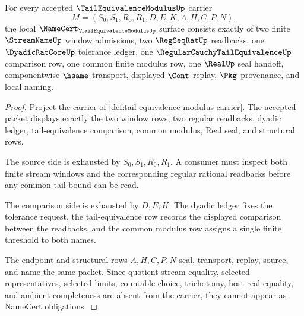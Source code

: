 \begin{theorem}
\label{thm:tail-equivalence-modulus-namecert-obligations}
For every accepted $\TailEquivalenceModulusUp$ carrier
$$
M=(S_0,S_1,R_0,R_1,D,E,K,A,H,C,P,N),
$$
the local $\NameCert_{\TailEquivalenceModulusUp}$ surface consists exactly of two finite $\StreamNameUp$ window admissions, two $\RegSeqRatUp$ readbacks, one $\DyadicRatCoreUp$ tolerance ledger, one $\RegularCauchyTailEquivalenceUp$ comparison row, one common finite modulus row, one $\RealUp$ seal handoff, componentwise $\hsame$ transport, displayed $\Cont$ replay, $\Pkg$ provenance, and local naming.
\end{theorem}
\begin{proof}
Project the carrier of \autoref{def:tail-equivalence-modulus-carrier}. The accepted packet displays exactly the two window rows, two regular readbacks, dyadic ledger, tail-equivalence comparison, common modulus, Real seal, and structural rows.

The source side is exhausted by $S_0,S_1,R_0,R_1$. A consumer must inspect both finite stream windows and the corresponding regular rational readbacks before any common tail bound can be read.

The comparison side is exhausted by $D,E,K$. The dyadic ledger fixes the tolerance request, the tail-equivalence row records the displayed comparison between the readbacks, and the common modulus row assigns a single finite threshold to both names.

The endpoint and structural rows $A,H,C,P,N$ seal, transport, replay, source, and name the same packet. Since quotient stream equality, selected representatives, selected limits, countable choice, trichotomy, host real equality, and ambient completeness are absent from the carrier, they cannot appear as NameCert obligations.
\end{proof}

